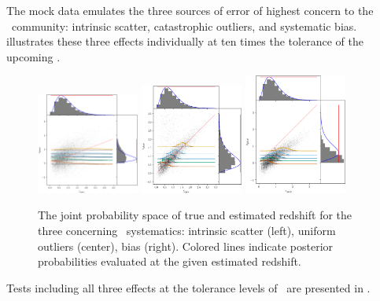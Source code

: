 The mock data emulates the three sources of error of highest concern to the \pz\ community: intrinsic scatter, catastrophic outliers, and systematic bias.
 illustrates these three effects individually at ten times the tolerance of the upcoming \lsst.
\begin{figure}
	\begin{center}
		\includegraphics[width=0.3\textwidth]{figures/chippr/hivarsigmas_scatter.png}
		\includegraphics[width=0.3\textwidth]{figures/chippr/uouthi_scatter.png}
		\includegraphics[width=0.3\textwidth]{figures/chippr/neghivarbias_scatter.png}
		\caption{The joint probability space of true and estimated redshift for the three concerning \pz\ systematics: intrinsic scatter (left), uniform outliers (center), bias (right).
			Colored lines indicate posterior probabilities evaluated at the given estimated redshift.
		}
	\end{center}
\end{figure}
Tests including all three effects at the tolerance levels of \lsst\ are presented in .

